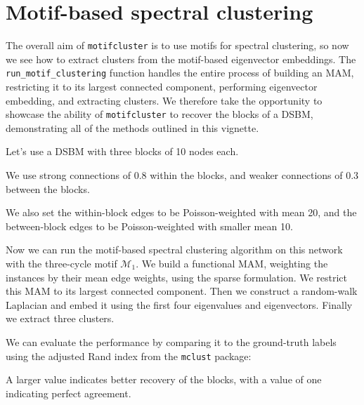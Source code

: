 \documentclass{article}
\begin{document}
\section{Motif-based spectral clustering}

The overall aim of \texttt{motifcluster} is to use motifs for spectral clustering,
so now we see how to extract clusters from the motif-based
eigenvector embeddings.
The \texttt{run\_motif\_clustering} function handles the entire process of
building an MAM, restricting it to its largest connected component,
performing eigenvector embedding, and extracting clusters.
We therefore take the opportunity to showcase the ability of
\texttt{motifcluster} to recover the blocks of a DSBM,
demonstrating all of the methods outlined in this vignette.

Let's use a DSBM with three blocks of 10 nodes each.

\begin{pyconsole}
\end{pyconsole}

We use strong connections of 0.8 within the blocks,
and weaker connections of 0.3 between the blocks.

\begin{pyconsole}
\end{pyconsole}

We also set the within-block edges to be Poisson-weighted with
mean 20,
and the between-block edges to be Poisson-weighted with smaller
mean 10.

\begin{pyconsole}

\end{pyconsole}

Now we can run the motif-based spectral clustering algorithm
on this network with the three-cycle motif $\mathcal{M}_1$.
We build a functional MAM,
weighting the instances by their mean edge weights,
using the sparse formulation.
We restrict this MAM to its largest connected component.
Then we construct a random-walk Laplacian and embed it using the
first four eigenvalues and eigenvectors.
Finally we extract three clusters.

\begin{pyconsole}
\end{pyconsole}

We can evaluate the performance by comparing it to the ground-truth
labels using the adjusted Rand index
from the \texttt{mclust} package:

\begin{pyconsole}
\end{pyconsole}

A larger value indicates better recovery of the blocks,
with a value of one indicating perfect agreement.
\end{document}
